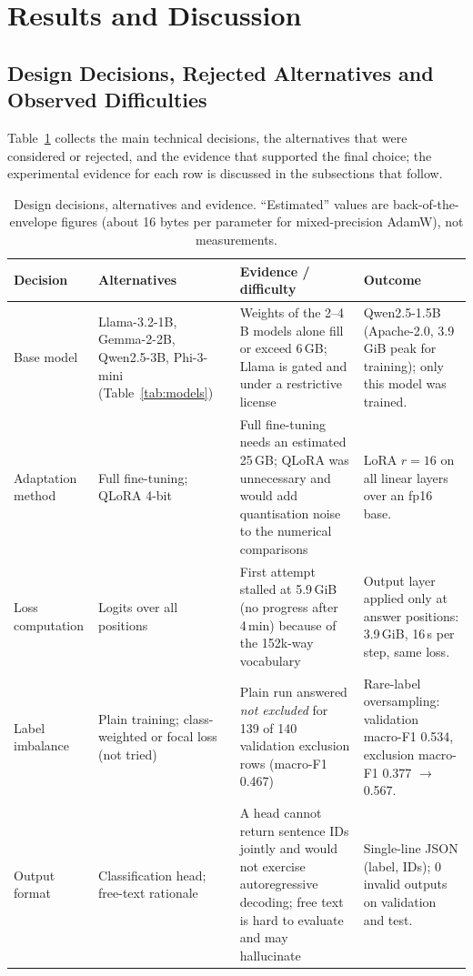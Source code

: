 \section{Results and Discussion}

\subsection{Design Decisions, Rejected Alternatives and Observed Difficulties}
Table~\ref{tab:decisions} collects the main technical decisions, the alternatives that were considered or rejected, and the evidence that supported the final choice; the experimental evidence for each row is discussed in the subsections that follow.

\begin{table}[t]
\caption{Design decisions, alternatives and evidence. ``Estimated'' values are back-of-the-envelope figures (about 16 bytes per parameter for mixed-precision AdamW), not measurements.}
\label{tab:decisions}
\centering\footnotesize
\begin{tabular}{p{2.3cm}p{3.5cm}p{4.6cm}p{5.6cm}}
\hline
Decision & Alternatives & Evidence / difficulty & Outcome \\
\hline
Base model & Llama-3.2-1B, Gemma-2-2B, Qwen2.5-3B, Phi-3-mini (Table~\ref{tab:models}) & Weights of the 2--4\,B models alone fill or exceed 6\,GB; Llama is gated and under a restrictive license & Qwen2.5-1.5B (Apache-2.0, 3.9\,GiB peak for training); only this model was trained. \\
Adaptation method & Full fine-tuning; QLoRA 4-bit & Full fine-tuning needs an estimated 25\,GB; QLoRA was unnecessary and would add quantisation noise to the numerical comparisons & LoRA $r=16$ on all linear layers over an fp16 base. \\
Loss computation & Logits over all positions & First attempt stalled at 5.9\,GiB (no progress after 4\,min) because of the 152k-way vocabulary & Output layer applied only at answer positions: 3.9\,GiB, 16\,s per step, same loss. \\
Label imbalance & Plain training; class-weighted or focal loss (not tried) & Plain run answered \emph{not excluded} for 139 of 140 validation exclusion rows (macro-F1 0.467) & Rare-label oversampling: validation macro-F1 0.534, exclusion macro-F1 0.377 $\rightarrow$ 0.567. \\
Output format & Classification head; free-text rationale & A head cannot return sentence IDs jointly and would not exercise autoregressive decoding; free text is hard to evaluate and may hallucinate & Single-line JSON (label, IDs); 0 invalid outputs on validation and test. \\

\end{tabular}
\end{table}
